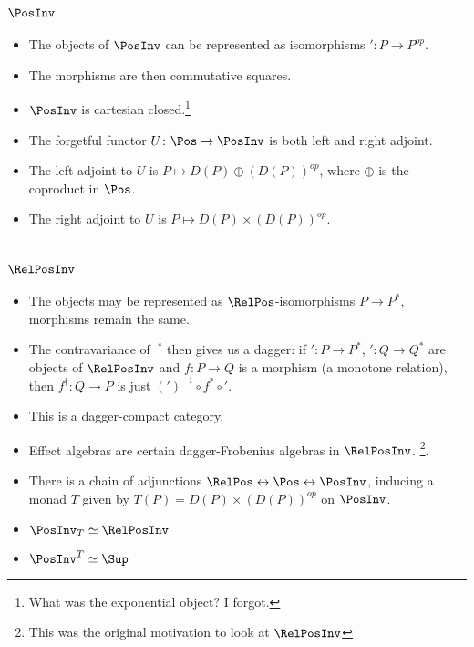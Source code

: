 \documentclass{article}
\theoremstyle{definition}
\begin{document}
\section{$\PosInv$}
\begin{itemize}
\item The objects of $\PosInv$ can be represented as isomorphisms $'\colon P\to P^{op}$.
\item The morphisms are then commutative squares.
\item $\PosInv$ is cartesian closed.\footnote{What was the exponential object? I forgot.}
\item The forgetful functor $U\colon\Pos\to\PosInv$ is both left and right adjoint.
\item The left adjoint to $U$ is $P\mapsto D(P)\oplus(D(P))^{op}$, where $\oplus$ is the coproduct in $\Pos$.
\item The right adjoint to $U$ is $P\mapsto D(P)\times(D(P))^{op}$.
\end{itemize}

\section{$\RelPosInv$}
\begin{itemize}
\item The objects may be represented as $\RelPos$-isomorphisms $P\to P^*$, morphisms remain the same.
\item The contravariance of $~^*$ then gives us a dagger: if $'\colon P\to P^*$, $'\colon Q\to Q^*$ are 
objects of $\RelPosInv$ and $f\colon P\to Q$ is a morphism (a monotone relation), then
$f^\dag\colon Q\to P$ is just $(')^{-1}\circ f^* \circ '$.
\item This is a dagger-compact category.
\item Effect algebras are certain dagger-Frobenius algebras in $\RelPosInv$.
\footnote{This was the original motivation to look at $\RelPosInv$}.
\item There is a chain of adjunctions $\RelPos\leftrightarrow\Pos\leftrightarrow\PosInv$,
inducing a monad $T$ given by $T(P)=D(P)\times (D(P))^{op}$ on $\PosInv$.
\item $\PosInv_T\simeq\RelPosInv$
\item $\PosInv^T\simeq\Sup$

\end{itemize}
\end{document}
